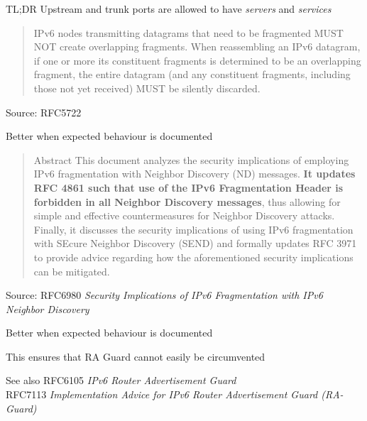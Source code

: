 \documentclass[Screen16to9,17pt]{foils}
\begin{document}
\begin{list2}
\item TL;DR Upstream and trunk ports are allowed to have \emph{servers} and \emph{services}
\end{list2}




\begin{quote}
  IPv6 nodes transmitting datagrams that need to be fragmented MUST NOT
   create overlapping fragments.  When reassembling an IPv6 datagram, if
   one or more its constituent fragments is determined to be an
   overlapping fragment, the entire datagram (and any constituent
   fragments, including those not yet received) MUST be silently
   discarded.
\end{quote}
Source: RFC5722

\begin{list2}
\item Better when expected behaviour is documented
\end{list2}



\begin{quote}
Abstract
   This document analyzes the security implications of employing IPv6
   fragmentation with Neighbor Discovery (ND) messages. {\bf  It updates RFC
   4861 such that use of the IPv6 Fragmentation Header is forbidden in
   all Neighbor Discovery messages}, thus allowing for simple and
   effective countermeasures for Neighbor Discovery attacks.  Finally,
   it discusses the security implications of using IPv6 fragmentation
   with SEcure Neighbor Discovery (SEND) and formally updates RFC 3971
   to provide advice regarding how the aforementioned security
   implications can be mitigated.
\end{quote}
Source: RFC6980 \emph{Security Implications of IPv6 Fragmentation with IPv6 Neighbor Discovery}

\begin{list2}
\item Better when expected behaviour is documented
\item This ensures that RA Guard cannot easily be circumvented
\item See also RFC6105 \emph{IPv6 Router Advertisement Guard} \\
RFC7113 \emph{Implementation Advice for IPv6 Router Advertisement Guard (RA-Guard)}
\end{list2}
\end{document}
